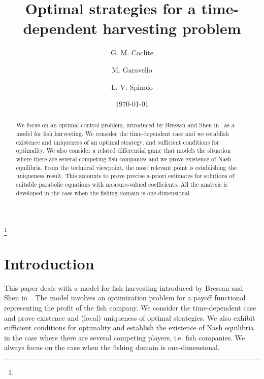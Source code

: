 \documentclass[11pt,leqno]{amsart}
\numberwithin{equation}{section}
\begin{document}
\title[Optimal strategies for a time-dependent harvesting problem]{Optimal strategies for a time-dependent harvesting problem}

\author{G. M. Coclite}
\address[Giuseppe Maria Coclite]{\newline
  Dipartimento di Matematica, Universit\`a di Bari,
  Via E.~Orabona 4,I--70125 Bari, Italy.}

\author{M. Garavello}
\address[Mauro Garavello]{\newline
  Dipartimento di Matematica e Applicazioni,
  Universit\`a di Milano Bicocca,
  Via R. Cozzi 53, I--20125 Milano, Italy.}

\author{L. V. Spinolo}
\address[Laura V. Spinolo]{\newline
IMATI-CNR, Via Ferrata 1, I--27100 Pavia, Italy.}

\date{\today}



\thanks{}

\begin{abstract}
  We focus on an optimal control problem, introduced by Bressan and
  Shen in~\cite{BS1} as a model for fish harvesting. We consider the
  time-dependent case and we establish existence and uniqueness of an
  optimal strategy, and sufficient conditions for optimality. We
  also consider a related differential game that models the situation
  where there are several competing fish companies and we prove
  existence of Nash equilibria.  From the technical viewpoint, the
  most relevant point is establishing the uniqueness result. This
  amounts to prove precise a-priori estimates for solutions of
  suitable parabolic equations with measure-valued coefficients.  All
  the analysis is developed in the case when the fishing domain is
  one-dimensional.
\end{abstract}

\maketitle

\section{Introduction}
\label{sec:1}
This paper deals with a model for fish harvesting introduced by Bressan and Shen in~\cite{BS1}. 
The model involves an optimization problem for a payoff functional representing the profit of the fish company. 
We consider the time-dependent case and  prove existence and (local) uniqueness of optimal strategies. We also exhibit sufficient conditions for optimality and establish the existence of Nash equilibria in the case where there are several competing players, i.e. fish companies. We always focus on the case when the fishing domain is one-dimensional. 
\end{document}
